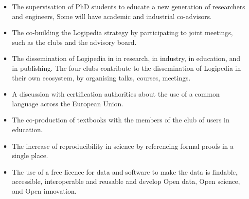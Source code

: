 \begin{itemize}
\item The supervisation of PhD students
to educate a new generation of researchers and engineers, 
Some will have academic and industrial co-advisors.

\item 
The co-building the Logipedia strategy
by participating to joint meetings, such as
the clubs and the advisory board.


\item 
The dissemination of Logipedia in in research, in industry, in
education, and in publishing.  The four clubs contribute to the
dissemination of Logipedia in their own ecosystem, by organising
talks, courses, meetings.

\item A discussion with certification authorities about the use of a
  common language across the European Union.

\item The co-production of textbooks with the members of the club of
  users in education.

\item The increase of reproducibility in science by referencing formal
  proofs in a single place.

\item The use of a free licence for data and software to make 
the data is findable, accessible, interoperable and reusable
and develop Open data, Open science, and Open innovation.
\end{itemize}

